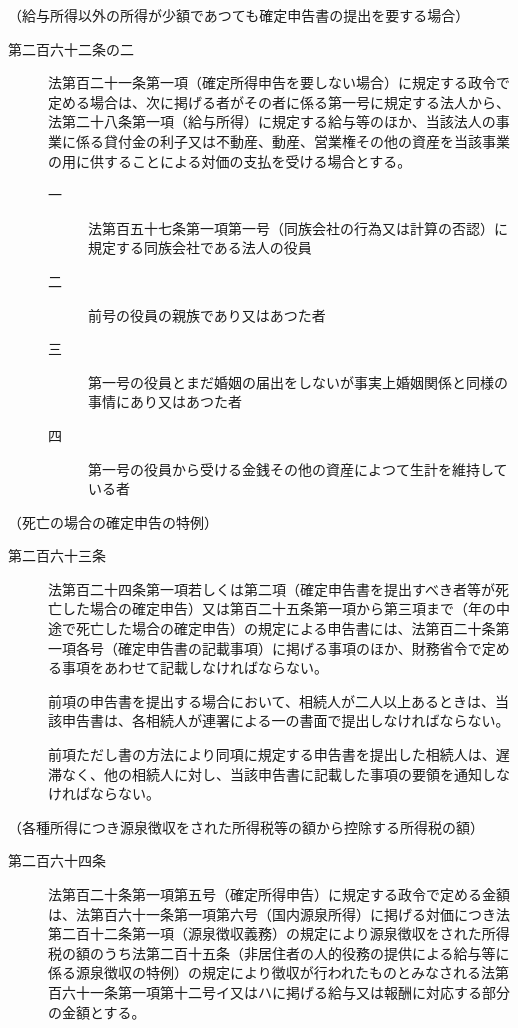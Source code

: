 \documentclass[twocolumn,a4j,10pt]{ltjtarticle}
\begin{document}
\noindent\hspace{10pt}（給与所得以外の所得が少額であつても確定申告書の提出を要する場合）
\begin{description}
\item[第二百六十二条の二]法第百二十一条第一項（確定所得申告を要しない場合）に規定する政令で定める場合は、次に掲げる者がその者に係る第一号に規定する法人から、法第二十八条第一項（給与所得）に規定する給与等のほか、当該法人の事業に係る貸付金の利子又は不動産、動産、営業権その他の資産を当該事業の用に供することによる対価の支払を受ける場合とする。
\begin{description}
\item[一]法第百五十七条第一項第一号（同族会社の行為又は計算の否認）に規定する同族会社である法人の役員
\item[二]前号の役員の親族であり又はあつた者
\item[三]第一号の役員とまだ婚姻の届出をしないが事実上婚姻関係と同様の事情にあり又はあつた者
\item[四]第一号の役員から受ける金銭その他の資産によつて生計を維持している者
\end{description}
\end{description}
\noindent\hspace{10pt}（死亡の場合の確定申告の特例）
\begin{description}
\item[第二百六十三条]法第百二十四条第一項若しくは第二項（確定申告書を提出すべき者等が死亡した場合の確定申告）又は第百二十五条第一項から第三項まで（年の中途で死亡した場合の確定申告）の規定による申告書には、法第百二十条第一項各号（確定申告書の記載事項）に掲げる事項のほか、財務省令で定める事項をあわせて記載しなければならない。
\item[]前項の申告書を提出する場合において、相続人が二人以上あるときは、当該申告書は、各相続人が連署による一の書面で提出しなければならない。
\item[]前項ただし書の方法により同項に規定する申告書を提出した相続人は、遅滞なく、他の相続人に対し、当該申告書に記載した事項の要領を通知しなければならない。
\end{description}
\noindent\hspace{10pt}（各種所得につき源泉徴収をされた所得税等の額から控除する所得税の額）
\begin{description}
\item[第二百六十四条]法第百二十条第一項第五号（確定所得申告）に規定する政令で定める金額は、法第百六十一条第一項第六号（国内源泉所得）に掲げる対価につき法第二百十二条第一項（源泉徴収義務）の規定により源泉徴収をされた所得税の額のうち法第二百十五条（非居住者の人的役務の提供による給与等に係る源泉徴収の特例）の規定により徴収が行われたものとみなされる法第百六十一条第一項第十二号イ又はハに掲げる給与又は報酬に対応する部分の金額とする。
\end{description}
\end{document}
